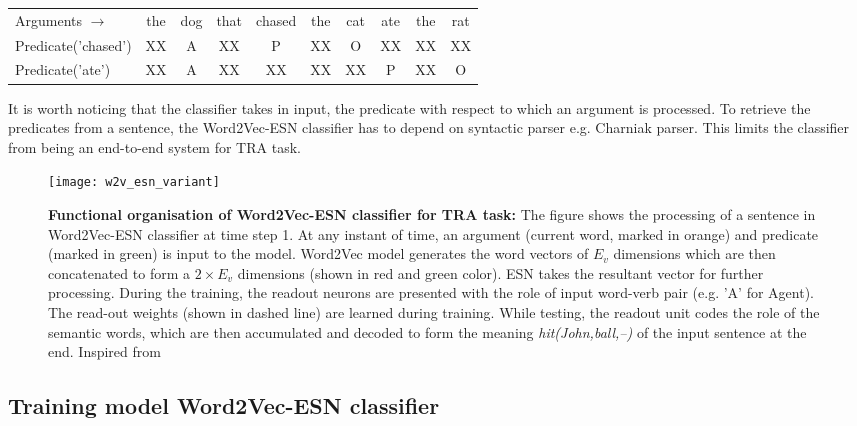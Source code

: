 \begin{table}[H]
\centering
\label{tab:argument-predicate}
\begin{tabular}{lccccccccc}
Arguments $\rightarrow$ & the & dog & that & chased & the & cat & ate & the & rat \\
Predicate('chased') 	 & XX  & A   & XX   & P      & XX  & O   & XX  & XX  & XX  \\
Predicate('ate')    	 & XX  & A   & XX   & XX     & XX  & XX  & P   & XX  & O  
\end{tabular}
\end{table}

It is worth noticing that the classifier takes in input, the predicate with respect to which an argument is processed. To retrieve the predicates from a sentence, the Word2Vec-ESN classifier has to depend on syntactic parser e.g. Charniak parser. This limits the classifier from being an end-to-end system for TRA task.  

\begin{figure}[hbtp]
\centering
\texttt{[image: w2v\_esn\_variant]}
\caption[Functional organisation of Word2Vec-ESN classifier for TRA task] {\textbf{Functional organisation of Word2Vec-ESN classifier for TRA task:} 
{\small The figure shows the processing of a sentence in Word2Vec-ESN classifier at time step 1. At any instant of time, an argument (current word, marked in orange) and predicate (marked in green) is input to the model. Word2Vec model generates the word vectors of $E_{v}$ dimensions which are then concatenated to form a $2 \times E_{v}$ dimensions (shown in red and green color). ESN takes the resultant vector for further processing. During the training, the readout neurons are presented with the role of input word-verb pair (e.g. 'A' for Agent). The read-out weights (shown in dashed line) are learned during training. While testing, the readout unit codes the role of the semantic words, which are then accumulated and decoded to form the meaning \textit{hit(John,ball,--)} of the input sentence at the end. Inspired from \cite{xavier:2013:RT}
}}
\label{fig:model_variant_2}
\end{figure}

\subsection{Training model Word2Vec-ESN classifier}

